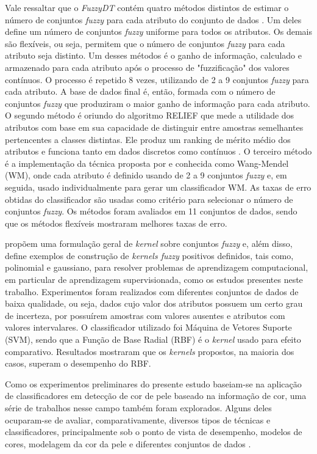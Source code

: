 Vale ressaltar que o \emph{FuzzyDT} contém quatro métodos distintos de estimar o número de conjuntos \emph{fuzzy} para cada atributo do conjunto de dados \citep{cintra:11}. Um deles define um número de conjuntos \emph{fuzzy} uniforme para todos os atributos. Os demais são flexíveis, ou seja, permitem que o número de conjuntos \emph{fuzzy} para cada atributo seja distinto. Um desses métodos é o ganho de informação, calculado e armazenado para cada atributo após o processo de "fuzzificação" dos valores contínuos. O processo é repetido 8 vezes, utilizando de 2 a 9 conjuntos \emph{fuzzy} para cada atributo. A base de dados final é, então, formada com o número de conjuntos \emph{fuzzy} que produziram o maior ganho de informação para cada atributo. O segundo método é oriundo do algoritmo RELIEF que mede a utilidade dos atributos com base em sua capacidade de distinguir entre amostras semelhantes pertencentes a classes distintas. Ele produz um ranking de mérito médio dos atributos e funciona tanto em dados discretos como contínuos \citep{kononenko:94}. O terceiro método é a implementação da técnica proposta por \citet{wang:03} e conhecida como Wang-Mendel (WM), onde cada atributo é definido usando de 2 a 9 conjuntos \emph{fuzzy} e, em seguida, usado individualmente para gerar um classificador WM. As taxas de erro obtidas do classificador são usadas como critério para selecionar o número de conjuntos \emph{fuzzy}. Os métodos foram avaliados em 11 conjuntos de dados, sendo que os métodos flexíveis mostraram melhores taxas de erro.

\citet{guevara:14} propõem uma formulação geral de \emph{kernel} sobre conjuntos \emph{fuzzy} e, além disso, define exemplos de construção de \emph{kernels fuzzy} positivos definidos, tais como, polinomial e gaussiano, para resolver problemas de aprendizagem computacional, em particular de aprendizagem supervisionada, como os estudos presentes neste trabalho. Experimentos foram realizados com diferentes conjuntos de dados de baixa qualidade, ou seja, dados cujo valor dos atributos possuem um certo grau de incerteza, por possuírem amostras com valores ausentes e atributos com valores intervalares. O classificador utilizado foi Máquina de Vetores Suporte (SVM), sendo que a Função de Base Radial (RBF) é o \emph{kernel} usado para efeito comparativo. Resultados mostraram que os \emph{kernels} propostos, na maioria dos casos, superam o desempenho do RBF.

Como os experimentos preliminares do presente estudo baseiam-se na aplicação de classificadores em detecção de cor de pele baseado na informação de cor, uma série de trabalhos nesse campo também foram explorados. Alguns deles ocuparam-se de avaliar, comparativamente, diversos tipos de técnicas e classificadores, principalmente sob o ponto de vista de desempenho, modelos de cores, modelagem da cor da pele e diferentes conjuntos de dados \citep{vezhnevets:03,kakumanu:07,mahmoodi:16}.

